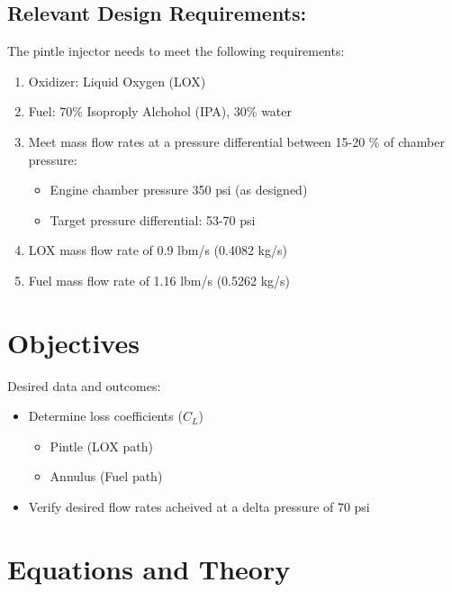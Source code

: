 \documentclass[11pt]{article}
\providecommand{\tightlist}{%
      \setlength{\itemsep}{0pt}\setlength{\parskip}{0pt}}
\begin{document}
\subsection{Relevant Design
Requirements:}\label{relevant-design-requirements}

The pintle injector needs to meet the following requirements:

\begin{enumerate}
\def\labelenumi{\arabic{enumi}.}
\tightlist
\item
  Oxidizer: Liquid Oxygen (LOX)
\item
  Fuel: 70\% Isoproply Alchohol (IPA), 30\% water
\item
  Meet mass flow rates at a pressure differential between 15-20 \% of
  chamber pressure:

  \begin{itemize}
  \tightlist
  \item
    Engine chamber pressure 350 psi (as designed)
  \item
    Target pressure differential: 53-70 psi\\
  \end{itemize}
\item
  LOX mass flow rate of 0.9 lbm/s (0.4082 kg/s)
\item
  Fuel mass flow rate of 1.16 lbm/s (0.5262 kg/s)
\end{enumerate}

    \section{Objectives}\label{objectives}

Desired data and outcomes:

\begin{itemize}
\tightlist
\item
  Determine loss coefficients (\(C_L\))

  \begin{itemize}
  \tightlist
  \item
    Pintle (LOX path)
  \item
    Annulus (Fuel path)
  \end{itemize}
\item
  Verify desired flow rates acheived at a delta pressure of 70 psi
\end{itemize}

    \section{Equations and Theory}\label{equations-and-theory}
\end{document}
